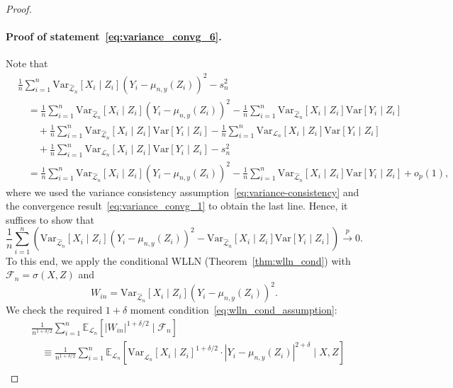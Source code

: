 \documentclass[12pt]{article}
\theoremstyle{definition}
\theoremstyle{remark}
\newcommand{\E}{\mathbb E}								%
\newcommand{\V}{\mathrm{Var}}							%
\newcommand{\convp}{\overset p \rightarrow}             %
\newcommand{\srx}{X}									%
\newcommand{\srz}{Z}									%
\newcommand{\sry}{Y}									%
\newcommand{\law}{\mathcal L}							%
\newcommand{\lawhat}{\widehat{\mathcal L}}				%
\begin{document}
\begin{proof}
\paragraph{Proof of statement~\eqref{eq:variance_convg_6}.}

Note that
\begin{equation*}
	\begin{split}
		&\frac{1}{n}\sum_{i = 1}^n \V_{\lawhat_n}[\srx_i\mid\srz_i](\sry_i - \mu_{n,y}(\srz_i))^2-s^2_n \\
		&\quad= \frac{1}{n}\sum_{i = 1}^n \V_{\lawhat_n}[\srx_i\mid\srz_i](\sry_i - \mu_{n,y}(\srz_i))^2 - \frac{1}{n}\sum_{i = 1}^n \V_{\lawhat_n}[\srx_i\mid\srz_i]\V[\sry_i \mid \srz_i]  \\
		&\quad \quad + \frac{1}{n}\sum_{i = 1}^n \V_{\lawhat_n}[\srx_i\mid\srz_i]\V[\sry_i \mid \srz_i] - \frac{1}{n}\sum_{i = 1}^n \V_{\law_n}[\srx_i\mid\srz_i]\V[\sry_i \mid \srz_i] \\
		&\quad \quad + \frac{1}{n}\sum_{i = 1}^n \V_{\law_n}[\srx_i\mid\srz_i]\V[\sry_i \mid \srz_i] - s^2_n \\
		&\quad = \frac{1}{n}\sum_{i = 1}^n \V_{\lawhat_n}[\srx_i\mid\srz_i](\sry_i - \mu_{n,y}(\srz_i))^2 - \frac{1}{n}\sum_{i = 1}^n \V_{\lawhat_n}[\srx_i\mid\srz_i]\V[\sry_i \mid \srz_i] + o_p(1),
	\end{split}
\end{equation*}
where we used the variance consistency assumption~\eqref{eq:variance-consistency} and the convergence result~\eqref{eq:variance_convg_1} to obtain the last line. Hence, it suffices to show that
\begin{equation}
	\frac{1}{n}\sum_{i = 1}^n \left(\V_{\lawhat_n}[\srx_i\mid\srz_i](\sry_i - \mu_{n,y}(\srz_i))^2 - \V_{\lawhat_n}[\srx_i\mid\srz_i]\V[\sry_i \mid \srz_i]\right) \convp 0.
	\label{eq:sufficient-convergence-2}
\end{equation}
To this end, we apply the conditional WLLN (Theorem~\ref{thm:wlln_cond}) with $\mathcal{F}_n = \sigma(X,Z)$ and
	\begin{equation*}
	W_{in} = \V_{\lawhat_n}[\srx_i\mid \srz_i](\sry_i-\mu_{n,y}(\srz_i))^2.
	\end{equation*}
	We check the required $1+\delta$ moment condition~\eqref{eq:wlln_cond_assumption}:
	\begin{align*}
		&\frac{1}{n^{1+\delta/2}} \sum_{i = 1}^n \E_{\law_n}[|W_{in}|^{1+\delta/2} \mid \mathcal{F}_n] \\
		&\quad\equiv \frac{1}{n^{1+\delta/2}} \sum_{i = 1}^n \E_{\law_n}\left[\V_{\lawhat_n}[\srx_i\mid \srz_i]^{1+\delta/2} \cdot |\sry_i-\mu_{n,y}(\srz_i)|^{2+\delta}\mid \srx,\srz\right]\\

\end{align*}
\end{proof}
\end{document}
